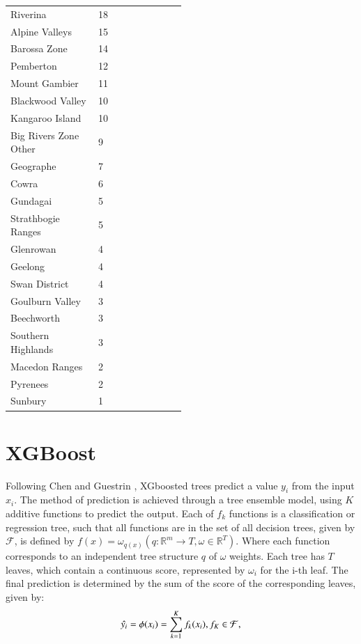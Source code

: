 \documentclass[review,12pt,authoryear]{elsarticle}
\begin{document}
\begin{linenumbers}
\begin{center}
\begin{longtable}{p{0.5\linewidth} p{.35\linewidth}}
  Riverina & 18 \\
  Alpine Valleys & 15 \\
  Barossa Zone & 14 \\
  Pemberton & 12 \\
  Mount Gambier & 11 \\
  Blackwood Valley & 10 \\
  Kangaroo Island & 10 \\
  Big Rivers Zone Other & 9 \\
  Geographe & 7 \\
  Cowra & 6 \\
  Gundagai & 5 \\
  Strathbogie Ranges & 5 \\
  Glenrowan & 4 \\
  Geelong & 4 \\
  Swan District & 4 \\
  Goulburn Valley & 3 \\
  Beechworth & 3 \\
  Southern Highlands & 3 \\
  Macedon Ranges & 2 \\
  Pyrenees & 2 \\
  Sunbury & 1 \\ \bottomrule
\end{longtable}
\end{center}
\clearpage

\section{XGBoost}
Following Chen and Guestrin \citep{chenXGBoostScalableTree2016}, XGboosted trees predict a value $y_i$ from the input $x_i$. The method of prediction is achieved through a tree ensemble model, using $K$ additive functions to predict the output. Each of $f_k$ functions is a classification or regression tree, such that all functions are in the set of all decision trees, given by $\mathcal{F}$, is defined by ${f(x) = \omega_{q(x)}}(q : \mathbb{R}^m \rightarrow T, \omega \in \mathbb{R}^T)$. Where each function corresponds to an independent tree structure $q$ of $\omega$ weights. Each tree has $T$ leaves, which contain a continuous score, represented by $\omega_i$ for the i-th leaf. The final prediction is determined by the sum of the score of the corresponding leaves, given by:
\begin{equation}
 \hat{y_i}=\phi(x_i)=\sum_{k=1}^{K}{f_{k}(x_{i})}, \space f_{K}\in \mathcal{F},
\end{equation}


\end{linenumbers}
\end{document}
